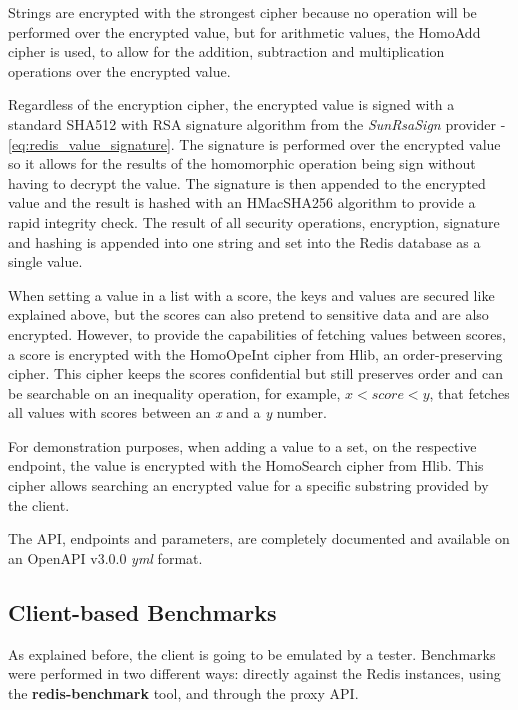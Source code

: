 Strings are encrypted with the strongest cipher because no operation will be performed over the encrypted value, but for arithmetic values, the HomoAdd cipher is used, to allow for the addition, subtraction and multiplication operations over the encrypted value.

Regardless of the encryption cipher, the encrypted value is signed with a standard SHA512 with \gls{RSA} signature algorithm from the \textit{SunRsaSign} provider - \ref{eq:redis_value_signature}. The signature is performed over the encrypted value so it allows for the results of the homomorphic operation being sign without having to decrypt the value. The signature is then appended to the encrypted value and the result is hashed with an HMacSHA256 algorithm to provide a rapid integrity check. The result of all security operations, encryption, signature and hashing is appended into one string and set into the Redis database as a single value.

When setting a value in a list with a score, the keys and values are secured like explained above, but the scores can also pretend to sensitive data and are also encrypted. However, to provide the capabilities of fetching values between scores, a score is encrypted with the HomoOpeInt cipher from Hlib, an order-preserving cipher. This cipher keeps the scores confidential but still preserves order and can be searchable on an inequality operation, for example, $ x < score < y $, that fetches all values with scores between an \textit{x} and a \textit{y} number.

For demonstration purposes, when adding a value to a set, on the respective endpoint, the value is encrypted with the HomoSearch cipher from Hlib. This cipher allows searching an encrypted value for a specific substring provided by the client.

The \gls{API}, endpoints and parameters, are completely documented and available on an OpenAPI v3.0.0 \textit{yml} format.

\subsection{Client-based Benchmarks}
\label{ssec:client_based_benchmarks}

As explained before, the client is going to be emulated by a tester. Benchmarks were performed in two different ways: directly against the Redis instances, using the \textbf{redis-benchmark} \cite{redis_benchmark_cli:1} tool, and through the proxy \gls{API}.

